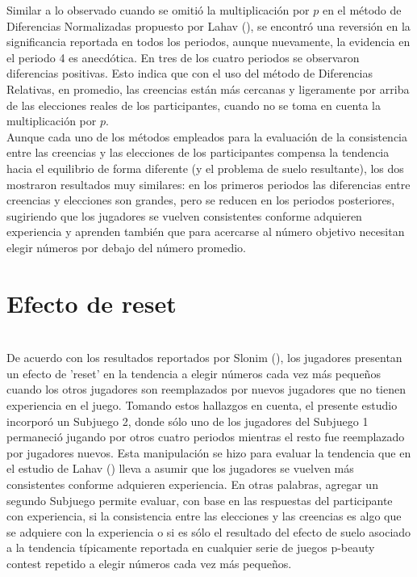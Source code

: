 Similar a lo observado cuando se omitió la multiplicación por $p$ en el método de Diferencias Normalizadas propuesto por Lahav (\citeyear{Lahav}), se encontró una reversión en la significancia reportada en todos los periodos, aunque nuevamente, la evidencia en el periodo 4 es anecdótica. En tres de los cuatro periodos se observaron diferencias positivas. Esto indica que con el uso del método de Diferencias Relativas, en promedio, las creencias están más cercanas y ligeramente por arriba de las elecciones reales de los participantes, cuando no se toma en cuenta la multiplicación por $p$.\\

Aunque cada uno de los métodos empleados para la evaluación de la consistencia entre las creencias y las elecciones de los participantes compensa la tendencia hacia el equilibrio de forma diferente (y el problema de suelo resultante), los dos mostraron resultados muy similares: en los primeros periodos las diferencias entre creencias y elecciones son grandes, pero se reducen en los periodos posteriores, sugiriendo que los jugadores se vuelven consistentes conforme adquieren experiencia y aprenden también que para acercarse al número objetivo necesitan elegir números por debajo del número promedio.\\

\section{Efecto de reset}\\

De acuerdo con los resultados reportados por Slonim (\citeyear{Slonim}), los jugadores presentan un efecto de 'reset' en la tendencia a elegir números cada vez más pequeños cuando los otros jugadores son reemplazados por nuevos jugadores que no tienen experiencia en el juego. Tomando estos hallazgos en cuenta, el presente estudio incorporó un Subjuego 2, donde sólo uno de los jugadores del Subjuego 1 permaneció jugando por otros cuatro periodos mientras el resto fue reemplazado por jugadores nuevos. Esta manipulación se hizo para evaluar la tendencia que en el estudio de Lahav (\citeyear{Lahav}) lleva a asumir que los jugadores se vuelven más consistentes conforme adquieren experiencia. En otras palabras, agregar un segundo Subjuego permite evaluar, con base en las respuestas del participante con experiencia, si la consistencia entre las elecciones y las creencias es algo que se adquiere con la experiencia o si es sólo el resultado del efecto de suelo asociado a la tendencia típicamente reportada en cualquier serie de juegos p-beauty contest repetido a elegir números cada vez más pequeños.\\

